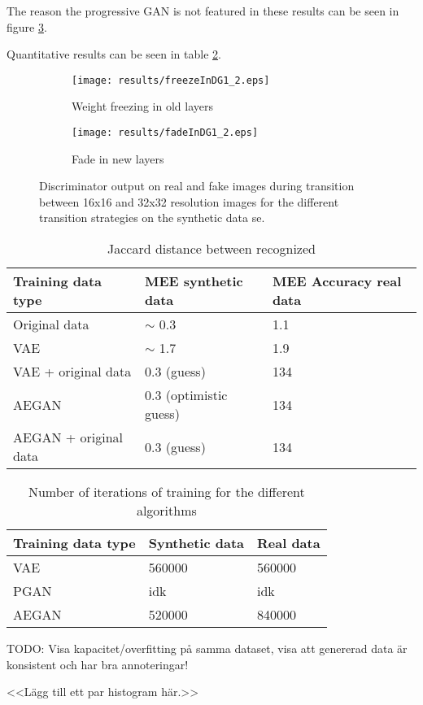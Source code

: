 The reason the progressive GAN is not featured in these results can be seen in figure \ref{fig:fadeVsFreeze}.

Quantitative results can be seen in table \ref{tab:quantitative_results}.

\begin{figure}[t]
    \centering
    \begin{subfigure}[b]{0.49\textwidth}
        \texttt{[image: results/freezeInDG1\_2.eps]}
        \caption{Weight freezing in old layers}
        \label{fig:freezeInDG1}
    \end{subfigure}
    \begin{subfigure}[b]{0.49\textwidth}
        \texttt{[image: results/fadeInDG1\_2.eps]}
        \caption{Fade in new layers}
        \label{fig:freezeInDG2}
    \end{subfigure}
    \caption{Discriminator output on real and fake images during transition between 16x16 and 32x32 resolution images for the different transition strategies on the synthetic data se.}
    \label{fig:fadeVsFreeze}
\end{figure}

\begin{table}[t]
    \centering
    \caption{Jaccard distance between recognized }
    \label{tab:quantitative_results}
    \begin{tabular}{l|l|l}
    \hline
    Training data type      & MEE synthetic data  & MEE Accuracy real data \\ \hline
    Original data           & $\sim$ 0.3 & 1.1     \\
    VAE                     & $\sim$ 1.7 & 1.9     \\
    VAE + original data     & 0.3 (guess) & 134     \\
    AEGAN                   & 0.3 (optimistic guess) & 134     \\
    AEGAN + original data   & 0.3 (guess) & 134     \\
    \end{tabular}
\end{table}

\begin{table}[t]
    \centering
    \caption{Number of iterations of training for the different algorithms}
    \label{tab:quantitative_results}
    \begin{tabular}{l|l|l}
    \hline
    Training data type      & Synthetic data  & Real data \\ \hline
    VAE                     & 560000 & 560000 \\
    PGAN                    & idk & idk     \\
    AEGAN                   & 520000 & 840000   \\
    \end{tabular}
\end{table}

TODO: Visa kapacitet/overfitting på samma dataset, visa att genererad data är konsistent och har bra annoteringar!

<<Lägg till ett par histogram här.>>
